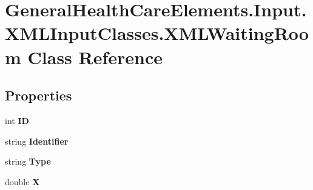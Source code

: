 \hypertarget{class_general_health_care_elements_1_1_input_1_1_x_m_l_input_classes_1_1_x_m_l_waiting_room}{}\section{General\+Health\+Care\+Elements.\+Input.\+X\+M\+L\+Input\+Classes.\+X\+M\+L\+Waiting\+Room Class Reference}
\label{class_general_health_care_elements_1_1_input_1_1_x_m_l_input_classes_1_1_x_m_l_waiting_room}
\subsection*{Properties}
\begin{DoxyCompactItemize}
\item 
int {\bfseries ID}\hypertarget{class_general_health_care_elements_1_1_input_1_1_x_m_l_input_classes_1_1_x_m_l_waiting_room_a5eb47e9f6eb83f889e1c05b8022c9274}{}\label{class_general_health_care_elements_1_1_input_1_1_x_m_l_input_classes_1_1_x_m_l_waiting_room_a5eb47e9f6eb83f889e1c05b8022c9274}

\item 
string {\bfseries Identifier}\hypertarget{class_general_health_care_elements_1_1_input_1_1_x_m_l_input_classes_1_1_x_m_l_waiting_room_a462a26cf5d3b31f4814eb291eb10bfe1}{}\label{class_general_health_care_elements_1_1_input_1_1_x_m_l_input_classes_1_1_x_m_l_waiting_room_a462a26cf5d3b31f4814eb291eb10bfe1}

\item 
string {\bfseries Type}\hypertarget{class_general_health_care_elements_1_1_input_1_1_x_m_l_input_classes_1_1_x_m_l_waiting_room_a3d1c2e5953afbc0614be299d92c0d82d}{}\label{class_general_health_care_elements_1_1_input_1_1_x_m_l_input_classes_1_1_x_m_l_waiting_room_a3d1c2e5953afbc0614be299d92c0d82d}

\item 
double {\bfseries X}\hypertarget{class_general_health_care_elements_1_1_input_1_1_x_m_l_input_classes_1_1_x_m_l_waiting_room_a9670788b2705e39567a2e4832654bf8a}{}\label{class_general_health_care_elements_1_1_input_1_1_x_m_l_input_classes_1_1_x_m_l_waiting_room_a9670788b2705e39567a2e4832654bf8a}


\end{DoxyCompactItemize}
